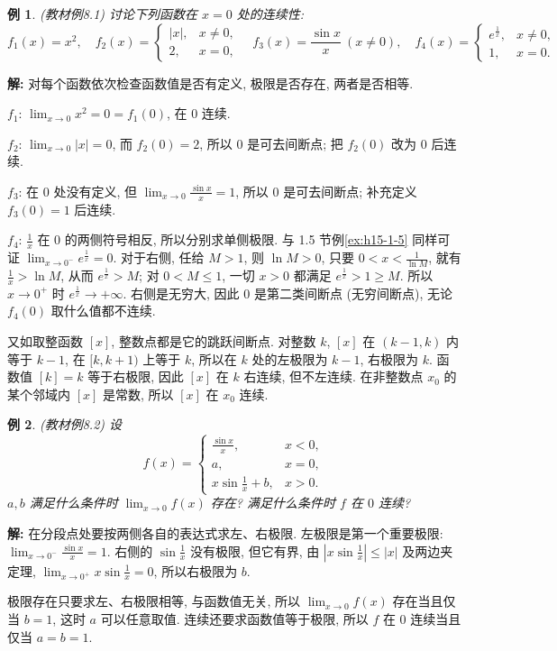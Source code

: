 \documentclass[UTF8,openany]{ctexbook}
\theoremstyle{chinesetextbook}
\newtheorem{example}{例}[section]
\newenvironment{cnsolution}{\par\indent\textbf{解:} \ignorespaces}{\par}
\begin{document}
\begin{example}\label{ex:8-1}
\textnormal{(教材例8.1)} 讨论下列函数在 $x=0$ 处的连续性:
\[
f_1(x)=x^2,\quad f_2(x)=\begin{cases}|x|,&x\ne0,\\2,&x=0,\end{cases}\quad f_3(x)=\frac{\sin x}x\ (x\ne0),\quad f_4(x)=\begin{cases}e^{\frac1x},&x\ne0,\\1,&x=0.\end{cases}
\]
\end{example}
\begin{cnsolution}
对每个函数依次检查函数值是否有定义, 极限是否存在, 两者是否相等.

$f_1$: $\displaystyle\lim_{x\to0}x^2=0=f_1(0)$, 在 $0$ 连续.

$f_2$: $\displaystyle\lim_{x\to0}|x|=0$, 而 $f_2(0)=2$, 所以 $0$ 是可去间断点; 把 $f_2(0)$ 改为 $0$ 后连续.

$f_3$: 在 $0$ 处没有定义, 但 $\displaystyle\lim_{x\to0}\frac{\sin x}x=1$, 所以 $0$ 是可去间断点; 补充定义 $f_3(0)=1$ 后连续.

$f_4$: $\displaystyle\frac1x$ 在 $0$ 的两侧符号相反, 所以分别求单侧极限. 与 1.5 节例\ref{ex:h15-1-5} 同样可证 $\displaystyle\lim_{x\to0^-}e^{\frac1x}=0$. 对于右侧, 任给 $M>1$, 则 $\ln M>0$, 只要 $\displaystyle0<x<\frac1{\ln M}$, 就有 $\displaystyle\frac1x>\ln M$, 从而 $e^{\frac1x}>M$; 对 $0<M\le1$, 一切 $x>0$ 都满足 $e^{\frac1x}>1\ge M$. 所以 $x\to0^+$ 时 $e^{\frac1x}\to+\infty$. 右侧是无穷大, 因此 $0$ 是第二类间断点 (无穷间断点), 无论 $f_4(0)$ 取什么值都不连续.
\end{cnsolution}
又如取整函数 $[x]$, 整数点都是它的跳跃间断点. 对整数 $k$, $[x]$ 在 $(k-1,k)$ 内等于 $k-1$, 在 $[k,k+1)$ 上等于 $k$, 所以在 $k$ 处的左极限为 $k-1$, 右极限为 $k$. 函数值 $[k]=k$ 等于右极限, 因此 $[x]$ 在 $k$ 右连续, 但不左连续. 在非整数点 $x_0$ 的某个邻域内 $[x]$ 是常数, 所以 $[x]$ 在 $x_0$ 连续.
\begin{example}
\textnormal{(教材例8.2)} 设
\[
f(x)=\begin{cases}\frac{\sin x}x,&x<0,\\a,&x=0,\\x\sin\frac1x+b,&x>0.\end{cases}
\]
$a,b$ 满足什么条件时 $\displaystyle\lim_{x\to0}f(x)$ 存在? 满足什么条件时 $f$ 在 $0$ 连续?
\end{example}
\begin{cnsolution}
在分段点处要按两侧各自的表达式求左、右极限. 左极限是第一个重要极限: $\displaystyle\lim_{x\to0^-}\frac{\sin x}x=1$. 右侧的 $\displaystyle\sin\frac1x$ 没有极限, 但它有界, 由 $\displaystyle\left|x\sin\frac1x\right|\le|x|$ 及两边夹定理, $\displaystyle\lim_{x\to0^+}x\sin\frac1x=0$, 所以右极限为 $b$.

极限存在只要求左、右极限相等, 与函数值无关, 所以 $\displaystyle\lim_{x\to0}f(x)$ 存在当且仅当 $b=1$, 这时 $a$ 可以任意取值. 连续还要求函数值等于极限, 所以 $f$ 在 $0$ 连续当且仅当 $a=b=1$.
\end{cnsolution}
\end{document}
